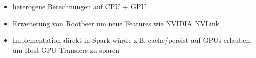 \begin{frame}
\begin{itemize}

       \item heterogene Berechnungen auf CPU + GPU %
       \item Erweiterung von Rootbeer um neue Features wie NVIDIA NVLink
       \item Implementation direkt in Spark würde z.B. cache/persist auf GPUs erlauben, um Host-GPU-Transfers zu sparen
    \end{itemize}
\end{frame}



